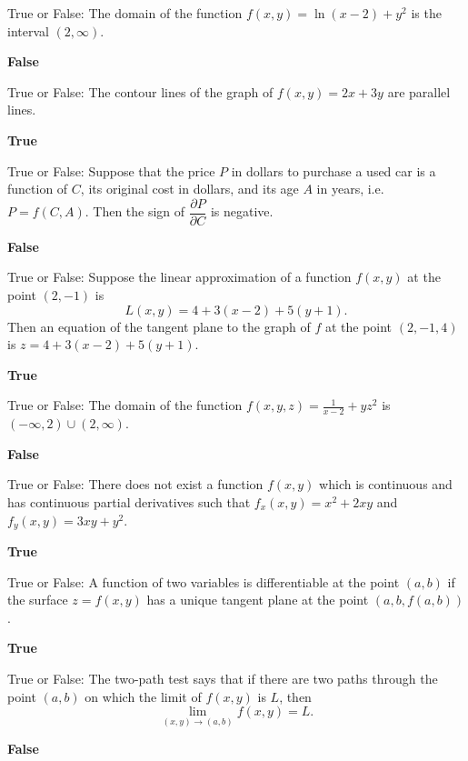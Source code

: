 \documentclass{exam}
\begin{document}
\begin{questions}
		\question True or False:  The domain of the function $f(x,y)=\ln{(x-2)}+y^2$ is the interval $(2,\infty)$.
		 \begin{solution}
		 	\textbf{False}
		 \end{solution}
		
		\question True or False: The contour lines of the graph of $f(x,y)=2x+3y$ are parallel lines.
		 \begin{solution}
		 	\textbf{True}
		 \end{solution}
		
		\question True or False: Suppose that the price $P$ in dollars to purchase a used car is a function of $C$, its original cost in dollars, and its age $A$ in years, i.e. $P=f(C,A)$.  Then the sign of $\dfrac{\partial P}{\partial C}$ is negative.
		 \begin{solution}
		 	\textbf{False}
		 \end{solution}
		
		\question True or False: Suppose the linear approximation of a function $f(x,y)$ at the point $(2,-1)$ is \[L(x,y)=4+3(x-2)+5(y+1).\]  Then an equation of the tangent plane to the graph of $f$ at the point $(2,-1,4)$ is $z=4+3(x-2)+5(y+1)$.
		 \begin{solution}
		 	\textbf{True}
		 \end{solution}

		\question True or False: The domain of the function $f(x,y,z)=\frac{1}{x-2}+yz^2$ is $(-\infty,2)\cup(2,\infty)$. 
		 \begin{solution}
		 	\textbf{False}
		 \end{solution}

		\question True or False: There does not exist a function $f(x,y)$ which is continuous and has continuous partial derivatives such that $f_x(x,y)=x^2+2xy$ and $f_y(x,y)=3xy+y^2$.
		\begin{solution}
			\textbf{True}
		\end{solution}

		\question True or False: A function of two variables is differentiable at the point $(a,b)$ if the surface $z=f(x,y)$ has a unique tangent plane at the point $(a,b,f(a,b))$.
		 \begin{solution}
		 	\textbf{True}
		 \end{solution}
		
		\question True or False: The two-path test says that if there are two paths through the point $(a,b)$ on which the limit of $f(x,y)$ is $L$, then \[\lim_{(x,y)\to(a,b)}f(x,y)=L.\]
		\begin{solution}
			\textbf{False}
		\end{solution}
		

\end{questions}
\end{document}
